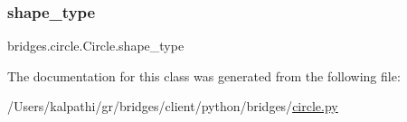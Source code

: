 \mbox{\label{classbridges_1_1circle_1_1_circle_a34d318970485d12445ce43225b81428e}} 
\subsubsection{\texorpdfstring{shape\+\_\+type}{shape\_type}}
{\footnotesize\ttfamily bridges.\+circle.\+Circle.\+shape\+\_\+type}



The documentation for this class was generated from the following file\+:\begin{DoxyCompactItemize}
\item 
/\+Users/kalpathi/gr/bridges/client/python/bridges/\mbox{\hyperlink{circle_8py}{circle.\+py}}\end{DoxyCompactItemize}
